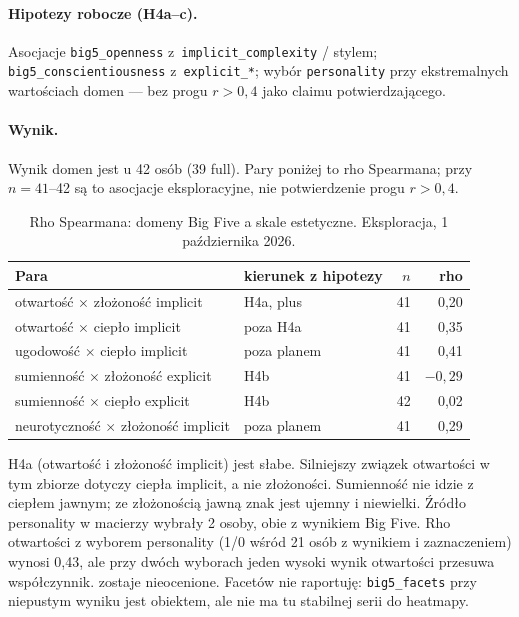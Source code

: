 \paragraph{Hipotezy robocze (H4a--c).}
Asocjacje \texttt{big5\_openness} z~\texttt{implicit\_complexity} / stylem; \texttt{big5\_conscientiousness} z~\texttt{explicit\_*}; wybór \texttt{personality} przy ekstremalnych wartościach domen --- bez progu $r\!>\!0{,}4$ jako claimu potwierdzającego.

\paragraph{Wynik.}
Wynik domen jest u 42 osób (39 full). Pary poniżej to rho Spearmana; przy $n=41$--42 są to asocjacje eksploracyjne, nie potwierdzenie progu $r>0{,}4$.

\begin{table}[htbp]
  \centering
  \small
  \caption{Rho Spearmana: domeny Big Five a skale estetyczne. Eksploracja, 1 października 2026.}
  \label{tab:ch08:big5}
  \begin{tabular}{llrr}
    \toprule
    Para & kierunek z hipotezy & $n$ & rho \\
    \midrule
    otwartość $\times$ złożoność implicit & H4a, plus & 41 & 0,20 \\
    otwartość $\times$ ciepło implicit & poza H4a & 41 & 0,35 \\
    ugodowość $\times$ ciepło implicit & poza planem & 41 & 0,41 \\
    sumienność $\times$ złożoność explicit & H4b & 41 & $-0{,}29$ \\
    sumienność $\times$ ciepło explicit & H4b & 42 & 0,02 \\
    neurotyczność $\times$ złożoność implicit & poza planem & 41 & 0,29 \\
    \bottomrule
  \end{tabular}
\end{table}

\noindent
H4a (otwartość i złożoność implicit) jest słabe. Silniejszy związek otwartości w tym zbiorze dotyczy ciepła implicit, a nie złożoności. Sumienność nie idzie z ciepłem jawnym; ze złożonością jawną znak jest ujemny i niewielki.
Źródło personality w macierzy wybrały 2 osoby, obie z wynikiem Big Five. Rho otwartości z wyborem personality (1/0 wśród 21 osób z wynikiem i zaznaczeniem) wynosi 0,43, ale przy dwóch wyborach jeden wysoki wynik otwartości przesuwa współczynnik.  zostaje nieocenione.
Facetów nie raportuję: \texttt{big5\_facets} przy niepustym wyniku jest obiektem, ale nie ma tu stabilnej serii do heatmapy.

